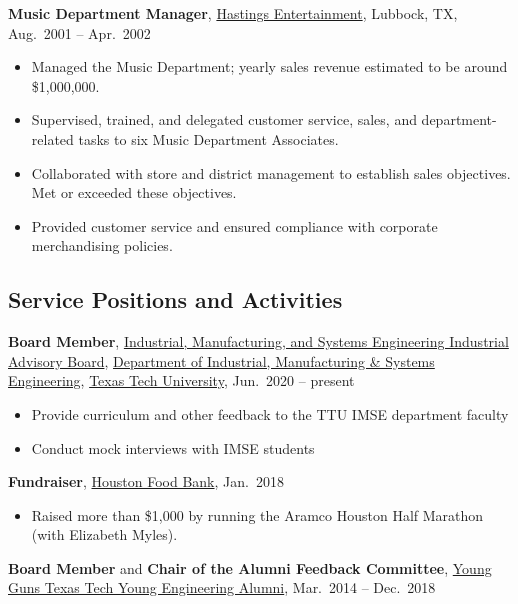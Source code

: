 \documentclass[
]{article}
\providecommand{\tightlist}{%
  \setlength{\itemsep}{0pt}\setlength{\parskip}{0pt}}
\begin{document}
\textbf{Music Department Manager},
\href{https://en.wikipedia.org/wiki/Hastings_Entertainment}{Hastings
Entertainment}, Lubbock, TX, Aug.~2001 -- Apr.~2002

\begin{itemize}
\tightlist
\item
  Managed the Music Department; yearly sales revenue estimated to be
  around \$1,000,000.
\item
  Supervised, trained, and delegated customer service, sales, and
  department-related tasks to six Music Department Associates.
\item
  Collaborated with store and district management to establish sales
  objectives.\\
  Met or exceeded these objectives.
\item
  Provided customer service and ensured compliance with corporate
  merchandising policies.
\end{itemize}

\hypertarget{service-positions-and-activities}{%
\subsection{Service Positions and
Activities}\label{service-positions-and-activities}}

\textbf{Board Member},
\href{https://www.depts.ttu.edu/imse/alumni/iab/index.php}{Industrial,
Manufacturing, and Systems Engineering Industrial Advisory Board},
\href{https://www.depts.ttu.edu/imse/}{Department of Industrial,
Manufacturing \& Systems Engineering}, \href{https://www.ttu.edu/}{Texas
Tech University}, Jun.~2020 -- present

\begin{itemize}
\tightlist
\item
  Provide curriculum and other feedback to the TTU IMSE department
  faculty
\item
  Conduct mock interviews with IMSE students
\end{itemize}

\textbf{Fundraiser}, \href{https://www.houstonfoodbank.org/}{Houston
Food Bank}, Jan.~2018

\begin{itemize}
\tightlist
\item
  Raised more than \$1,000 by running the Aramco Houston Half Marathon
  (with Elizabeth Myles).
\end{itemize}

\textbf{Board Member} and \textbf{Chair of the Alumni Feedback
Committee}, \href{http://www.ttuyoungguns.com/}{Young Guns Texas Tech
Young Engineering Alumni}, Mar.~2014 -- Dec.~2018
\end{document}
